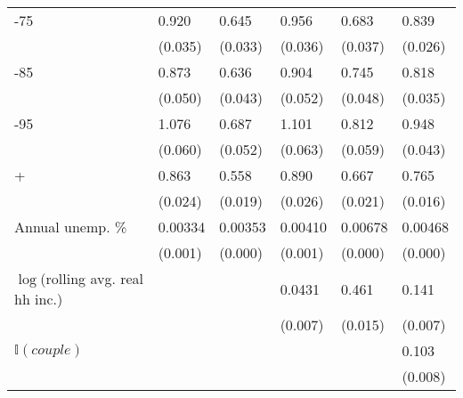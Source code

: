\begin{table}[h!]
\begin{tabular}{p{5cm} p{2cm}p{2cm}p{2cm}p{2cm}p{2cm}}
\MyIndent 65-75               &       0.920\sym{***}&       0.645\sym{***}&       0.956\sym{***}&       0.683\sym{***}&       0.839\sym{***}\\
                    &     (0.035)         &     (0.033)         &     (0.036)         &     (0.037)         &     (0.026)         \\

\MyIndent 75-85               &       0.873\sym{***}&       0.636\sym{***}&       0.904\sym{***}&       0.745\sym{***}&       0.818\sym{***}\\
                    &     (0.050)         &     (0.043)         &     (0.052)         &     (0.048)         &     (0.035)         \\

\MyIndent 85-95               &       1.076\sym{***}&       0.687\sym{***}&       1.101\sym{***}&       0.812\sym{***}&       0.948\sym{***}\\
                    &     (0.060)         &     (0.052)         &     (0.063)         &     (0.059)         &     (0.043)         \\

\MyIndent 95+                 &       0.863\sym{***}&       0.558\sym{***}&       0.890\sym{***}&       0.667\sym{***}&       0.765\sym{***}\\
                    &     (0.024)         &     (0.019)         &     (0.026)         &     (0.021)         &     (0.016)         \\

Annual unemp. \%   &     0.00334\sym{***}&     0.00353\sym{***}&     0.00410\sym{***}&     0.00678\sym{***}&     0.00468\sym{***}\\
                    &     (0.001)         &     (0.000)         &     (0.001)         &     (0.000)         &     (0.000)         \\

$\log$(rolling avg. real hh inc.)&                     &                     &      0.0431\sym{***}&       0.461\sym{***}&       0.141\sym{***}\\
                    &                     &                     &     (0.007)         &     (0.015)         &     (0.007)         \\

$\mathbb{I}{(couple)}$             &                     &                     &                     &                     &       0.103\sym{***}\\
                    &                     &                     &                     &                     &     (0.008)         \\


\end{tabular}
\end{table}
